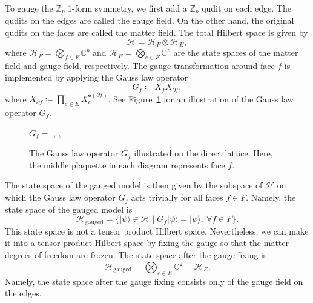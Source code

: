 \documentclass[aps,twocolumn,prx,floatfix,preprintnumbers, nofootinbib,10pt]{revtex4-2}
\numberwithin{equation}{section}
\theoremstyle{definition}
\theoremstyle{remark}
\theoremstyle{claim}
\def\ket#1{{|{#1}\rangle}}
\begin{document}
To gauge the $\mathbb{Z}_p$ 1-form symmetry, we first add a $\mathbb{Z}_p$ qudit on each edge.
The qudits on the edges are called the gauge field.
On the other hand, the original qudits on the faces are called the matter field.
The total Hilbert space is given by 
\begin{equation}
\mathcal{H} = \mathcal{H}_F \otimes \mathcal{H}_E,
\end{equation}
where $\mathcal{H}_F = \bigotimes_{f \in F} \mathbb{C}^{p}$ and $\mathcal{H}_E = \bigotimes_{e \in E} \mathbb{C}^{p}$ are the state spaces of the matter field and gauge field, respectively.
The gauge transformation around face $f$ is implemented by applying the Gauss law operator
\begin{equation}
G_f \coloneq X_f X_{\partial f},
\label{eq: Gauss law op Zp}
\end{equation}
where $X_{\partial f} \coloneq \prod_{e \in E} X_e^{\bm{e}(\partial f)}$.
See Figure~\ref{fig: Gauss Zp} for an illustration of the Gauss law operator $G_f$.
\begin{figure}[t]
\centering
$G_f =$
,
,
\caption{The Gauss law operator $G_f$ illustrated on the direct lattice. Here, the middle plaquette in each diagram represents face $f$.}
\label{fig: Gauss Zp}
\end{figure}
The state space of the gauged model is then given by the subspace of $\mathcal{H}$ on which the Gauss law operator $G_f$ acts trivially for all faces $f \in F$.
Namely, the state space of the gauged model is
\begin{equation}
\mathcal{H}_{\mathrm{gauged}} = \{\ket{\psi} \in \mathcal{H} \mid G_f \ket{\psi} = \ket{\psi}, ~ \forall f \in F\}.
\end{equation}
This state space is not a tensor product Hilbert space.
Nevertheless, we can make it into a tensor product Hilbert space by fixing the gauge so that the matter degrees of freedom are frozen.
The state space after the gauge fixing is
\begin{equation}
\mathcal{H}_{\mathrm{gauged}}^{\prime} = \bigotimes_{e \in E} \mathbb{C}^2 = \mathcal{H}_E.
\end{equation}
Namely, the state space after the gauge fixing consists only of the gauge field on the edges.
\end{document}
